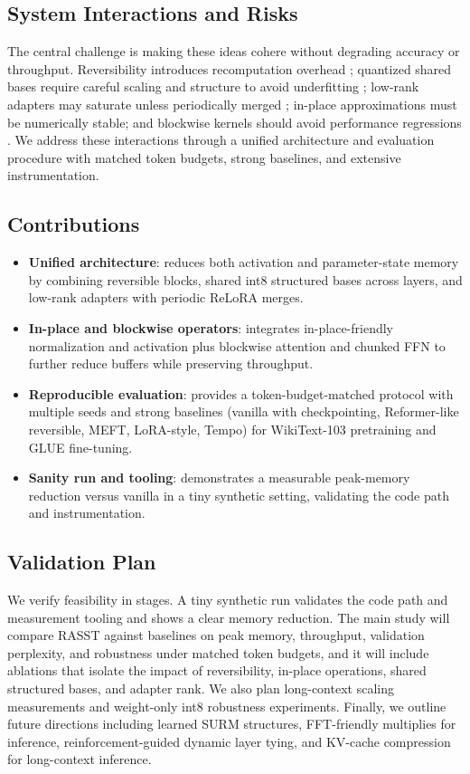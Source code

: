 \documentclass{article}
\begin{document}
\subsection{System Interactions and Risks}
The central challenge is making these ideas cohere without degrading accuracy or throughput. Reversibility introduces recomputation overhead \cite{kitaev-2020-reformer}; quantized shared bases require careful scaling and structure to avoid underfitting \cite{sehanobish-2024-structured}; low-rank adapters may saturate unless periodically merged \cite{lialin-2023-relora}; in-place approximations must be numerically stable; and blockwise kernels should avoid performance regressions \cite{liu-2023-blockwise}. We address these interactions through a unified architecture and evaluation procedure with matched token budgets, strong baselines, and extensive instrumentation.

\subsection{Contributions}
\begin{itemize}
  \item \textbf{Unified architecture}: reduces both activation and parameter-state memory by combining reversible blocks, shared int8 structured bases across layers, and low-rank adapters with periodic ReLoRA merges.
  \item \textbf{In-place and blockwise operators}: integrates in-place-friendly normalization and activation plus blockwise attention and chunked FFN to further reduce buffers while preserving throughput.
  \item \textbf{Reproducible evaluation}: provides a token-budget-matched protocol with multiple seeds and strong baselines (vanilla with checkpointing, Reformer-like reversible, MEFT, LoRA-style, Tempo) for WikiText-103 pretraining and GLUE fine-tuning.
  \item \textbf{Sanity run and tooling}: demonstrates a measurable peak-memory reduction versus vanilla in a tiny synthetic setting, validating the code path and instrumentation.
\end{itemize}

\subsection{Validation Plan}
We verify feasibility in stages. A tiny synthetic run validates the code path and measurement tooling and shows a clear memory reduction. The main study will compare RASST against baselines on peak memory, throughput, validation perplexity, and robustness under matched token budgets, and it will include ablations that isolate the impact of reversibility, in-place operations, shared structured bases, and adapter rank. We also plan long-context scaling measurements and weight-only int8 robustness experiments. Finally, we outline future directions including learned SURM structures, FFT-friendly multiplies for inference, reinforcement-guided dynamic layer tying, and KV-cache compression for long-context inference.
\end{document}
